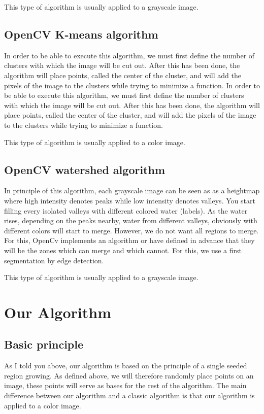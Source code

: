 \documentclass[conference]{IEEEtran}
\begin{document}
This type of algorithm is usually applied to a grayscale image.


\subsection{OpenCV K-means algorithm}

In order to be able to execute this algorithm, we must first define the number of clusters with which the image will be cut out. After this has been done, the algorithm will place points, called the center of the cluster, and will add the pixels of the image to the clusters while trying to minimize a function.
In order to be able to execute this algorithm, we must first define the number of clusters with which the image will be cut out. After this has been done, the algorithm will place points, called the center of the cluster, and will add the pixels of the image to the clusters while trying to minimize a function.

This type of algorithm is usually applied to a color image.

\subsection{OpenCV watershed algorithm}

In principle of this algorithm, each grayscale image can be seen as as a heightmap where high intensity denotes peaks while low intensity denotes valleys. You start filling every isolated valleys with different colored water (labels). As the water rises, depending on the peaks nearby, water from different valleys, obviously with different colors will start to merge.  However, we do not want all regions to merge.
For this, OpenCv implements an algorithm or have defined in advance that they will be the zones which can merge and which cannot. For this, we use a first segmentation by edge detection.

This type of algorithm is usually applied to a grayscale image.

\section{Our Algorithm}

\subsection{Basic principle}

As I told you above, our algorithm is based on the principle of a single seeded region growing. As defined above, we will therefore randomly place points on an image, these points will serve as bases for the rest of the algorithm. The main difference between our algorithm and a classic algorithm is that our algorithm is applied to a color image.
\end{document}
